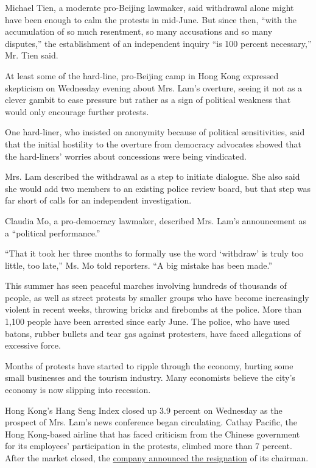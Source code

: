Michael Tien, a moderate pro-Beijing lawmaker, said withdrawal alone
might have been enough to calm the protests in mid-June. But since then,
``with the accumulation of so much resentment, so many accusations and
so many disputes,'' the establishment of an independent inquiry ``is 100
percent necessary,'' Mr. Tien said.

At least some of the hard-line, pro-Beijing camp in Hong Kong expressed
skepticism on Wednesday evening about Mrs. Lam's overture, seeing it not
as a clever gambit to ease pressure but rather as a sign of political
weakness that would only encourage further protests.

One hard-liner, who insisted on anonymity because of political
sensitivities, said that the initial hostility to the overture from
democracy advocates showed that the hard-liners' worries about
concessions were being vindicated.

Mrs. Lam described the withdrawal as a step to initiate dialogue. She
also said she would add two members to an existing police review board,
but that step was far short of calls for an independent investigation.

Claudia Mo, a pro-democracy lawmaker, described Mrs. Lam's announcement
as a ``political performance.''

``That it took her three months to formally use the word `withdraw' is
truly too little, too late,'' Ms. Mo told reporters. ``A big mistake has
been made.''

This summer has seen peaceful marches involving hundreds of thousands of
people, as well as street protests by smaller groups who have become
increasingly violent in recent weeks, throwing bricks and firebombs at
the police. More than 1,100 people have been arrested since early June.
The police, who have used batons, rubber bullets and tear gas against
protesters, have faced allegations of excessive force.

Months of protests have started to ripple through the economy, hurting
some small businesses and the tourism industry. Many economists believe
the city's economy is now slipping into recession.

Hong Kong's Hang Seng Index closed up 3.9 percent on Wednesday as the
prospect of Mrs. Lam's news conference began circulating. Cathay
Pacific, the Hong Kong-based airline that has faced criticism from the
Chinese government for its employees' participation in the protests,
climbed more than 7 percent. After the market closed, the
\href{https://www.nytimes3xbfgragh.onion/2019/09/04/business/cathay-pacific-chairman-resigns.html}{company
announced the resignation} of its chairman.

